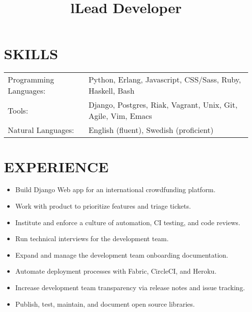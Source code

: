 \documentclass[line]{res}
\title{l}\dates{r}\\
\begin{document}
\begin{resume}

\section{SKILLS}
\begin{tabular}{ l l }
Programming Languages: &
Python,
Erlang,
Javascript,
CSS/Sass,
Ruby,
Haskell,
Bash\\

Tools: &
Django,
Postgres,
Riak,
Vagrant,
Unix,
Git,
Agile,
Vim,
Emacs \\

Natural Languages: &
English (fluent),
Swedish (proficient)
\end{tabular}

\section {EXPERIENCE}
\vspace {2 pt}

\title{Lead Developer}
\begin{position}
\noindent
\vspace {-10 pt}
\begin{itemize}

\item Build Django Web app for an international crowdfunding platform.
\item Work with product to prioritize features and triage tickets.
\item Institute and enforce a culture of automation, CI testing, and code reviews.
\item Run technical interviews for the development team.
\item Expand and manage the development team onboarding documentation.
\item Automate deployment processes with Fabric, CircleCI, and Heroku.
\item Increase development team transparency via release notes and issue tracking.
\item Publish, test, maintain, and document open source libraries.

\end{itemize}
\end{position}



\end{resume}
\end{document}
